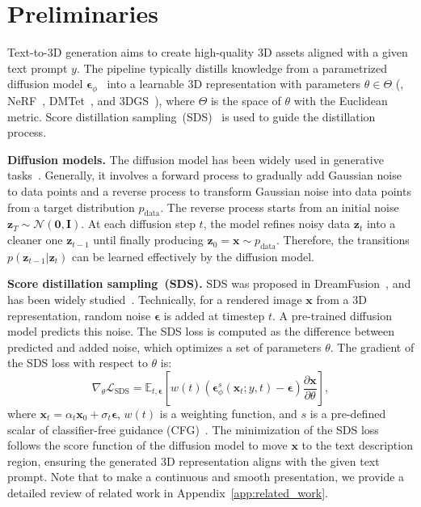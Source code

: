 \vspace{-7pt}
\section{Preliminaries}
\label{sec:pre}
\vspace{-3pt}
Text-to-3D generation aims to create high-quality 3D assets aligned with a given text prompt $y$.
The pipeline typically distills knowledge from a parametrized diffusion model $\bm{\epsilon}_\phi$~\citep{rombach2022high,shi2023mvdream} into a learnable 3D representation with parameters $\theta\in\Theta$ (\eg, NeRF~\citep{mildenhall2020nerf}, DMTet~\citep{shen2021deep}, and 3DGS~\citep{kerbl3Dgaussians}), where $\Theta$ is the space of $\theta$ with the Euclidean metric. Score distillation sampling~(SDS)~\citep{poole2022dreamfusion} is used to guide the distillation process. 

\textbf{Diffusion models.} The diffusion model has been widely used in generative tasks~\citep{sohl2015deep,song2022diffusion,bao2022analytic,peebles2023scalable}. Generally, it involves a forward process to gradually add Gaussian noise to data points and a reverse process to transform Gaussian noise into data points from a target distribution $p_{\mathrm{data}}$. The reverse process starts from an initial noise $\mathbf{z}_T\sim\mathcal{N}(\mathbf{0}, \mathbf{I})$. At each diffusion step $t$, the model refines noisy data $\mathbf{z}_t$ into a cleaner one $\mathbf{z}_{t-1}$ until finally producing $\mathbf{z}_0 = \mathbf{x}\sim p_{\mathrm{data}}$. Therefore, the transitions $p(\mathbf{z}_{t-1}|\mathbf{z}_{t})$ can be learned effectively by the diffusion model.

\textbf{Score distillation sampling~(SDS).} SDS was proposed in DreamFusion~\citep{poole2022dreamfusion}, and has been widely studied~\citep{wang2023prolificdreamer,yu2023text,katzir2023noise,chung2023luciddreamer,wu2024consistent3d,zhuo2025vividdreamer,ye2025dreamreward}. Technically, for a rendered image $\mathbf{x}$ from a 3D representation, random noise $\bm{\epsilon}$ is added at timestep $t$. 
A pre-trained diffusion model predicts this noise. The SDS loss is computed as the difference between predicted and added noise, which optimizes a set of parameters $\theta$. The gradient of the SDS loss with respect to $\theta$ is:
\begin{equation}
    \nabla_\theta \mathcal{L}_{\text{SDS}} = \mathbb{E}_{t, \bm{\epsilon}}[w(t) (\bm{\epsilon}^s_{\phi}(\mathbf{x}_t;y,t)-\bm{\epsilon})\frac{\partial\mathbf{x}}{\partial\theta}],
\end{equation}
where $\mathbf{x}_t = \alpha_t \mathbf{x}_0 + \sigma_t \bm{\epsilon}$, $w(t)$ is a weighting function, and $s$ is a pre-defined scalar of classifier-free guidance (CFG)~\citep{ho2022classifier}. The minimization of the SDS loss follows the score function of the diffusion model to move $\mathbf{x}$ to the text description region, ensuring the generated 3D representation aligns with the given text prompt. Note that to make a continuous and smooth presentation, we provide a detailed review of related work in Appendix~\ref{app:related_work}.
